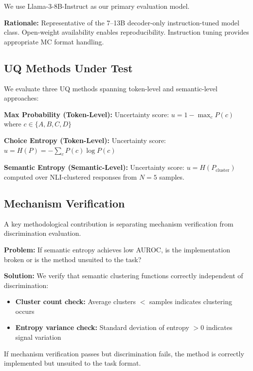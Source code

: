 We use Llama-3-8B-Instruct as our primary evaluation model.

\textbf{Rationale:} Representative of the 7--13B decoder-only instruction-tuned model class. Open-weight availability enables reproducibility. Instruction tuning provides appropriate MC format handling.

\subsection{UQ Methods Under Test}

We evaluate three UQ methods spanning token-level and semantic-level approaches:

\textbf{Max Probability (Token-Level):} Uncertainty score: $u = 1 - \max_c P(c)$ where $c \in \{A, B, C, D\}$

\textbf{Choice Entropy (Token-Level):} Uncertainty score: $u = H(P) = -\sum_c P(c) \log P(c)$

\textbf{Semantic Entropy (Semantic-Level):} Uncertainty score: $u = H(P_{\text{cluster}})$ computed over NLI-clustered responses from $N=5$ samples.

\subsection{Mechanism Verification}

A key methodological contribution is separating mechanism verification from discrimination evaluation.

\textbf{Problem:} If semantic entropy achieves low AUROC, is the implementation broken or is the method unsuited to the task?

\textbf{Solution:} We verify that semantic clustering functions correctly independent of discrimination:
\begin{itemize}
    \item \textbf{Cluster count check:} Average clusters $<$ samples indicates clustering occurs
    \item \textbf{Entropy variance check:} Standard deviation of entropy $> 0$ indicates signal variation
\end{itemize}

If mechanism verification passes but discrimination fails, the method is correctly implemented but unsuited to the task format.
